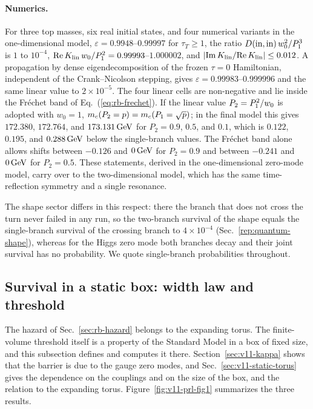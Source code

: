 \paragraph{Numerics.}
For three top masses, six real initial states, and four numerical variants in the one-dimensional model, $\varepsilon=0.9948$--$0.99997$ for $\tau_T\ge1$, the ratio $D({\rm in},{\rm in})\,w_0^2/P_1^3$ is $1$ to $10^{-4}$, ${\rm Re}\,K_{\rm lin}\,w_0/P_1^2=0.99993$--$1.000002$, and $|{\rm Im}\,K_{\rm lin}/{\rm Re}\,K_{\rm lin}|\le0.012$. %
A propagation by dense eigendecomposition of the frozen $\tau=0$ Hamiltonian, independent of the Crank--Nicolson stepping, gives $\varepsilon=0.99983$--$0.999996$ and the same linear value to $2\times10^{-5}$. %
The four linear cells are non-negative and lie inside the Fr\'echet band of Eq.~(\ref{eq:rb-frechet}).
If the linear value $P_2=P_1^2/w_0$ is adopted with $w_0=1$, $m_c(P_2=p)=m_c(P_1=\sqrt p)$; in the final model this gives $172.380$, $172.764$, and $173.131\,\mathrm{GeV}$ for $P_2=0.9$, $0.5$, and $0.1$, which is $0.122$, $0.195$, and $0.288\,\mathrm{GeV}$ below the single-branch values. %
The Fr\'echet band alone allows shifts between $-0.126$ and $0\,\mathrm{GeV}$ for $P_2=0.9$ and between $-0.241$ and $0\,\mathrm{GeV}$ for $P_2=0.5$. %
These statements, derived in the one-dimensional zero-mode model, carry over to the two-dimensional model, which has the same time-reflection symmetry and a single resonance.

The shape sector differs in this respect: there the branch that does not cross the turn never failed in any run, so the two-branch survival of the shape equals the single-branch survival of the crossing branch to $4\times10^{-4}$ (Sec.~\ref{rep:quantum-shape}), whereas for the Higgs zero mode both branches decay and their joint survival has no probability. %
We quote single-branch probabilities throughout.

\subsection{Survival in a static box: width law and threshold}
\label{sec:v11-static-box}

The hazard of Sec.~\ref{sec:rb-hazard} belongs to the expanding torus.
The finite-volume threshold itself is a property of the Standard Model in a box of fixed size, and this subsection defines and computes it there.
Section~\ref{sec:v11-kappa} shows that the barrier is due to the gauge zero modes, and Sec.~\ref{sec:v11-static-torus} gives the dependence on the couplings and on the size of the box, and the relation to the expanding torus.
Figure~\ref{fig:v11-prl-fig1} summarizes the three results.


